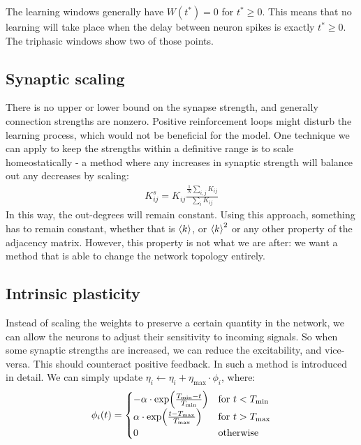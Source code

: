 The learning windows generally have $W(t^{\ast}) = 0$ for $t^{\ast} \geq 0$. This means that no learning will take place when the delay between neuron spikes is exactly $t^{\ast} \geq 0$. The triphasic windows show two of those points. 


\subsection{Synaptic scaling}
There is no upper or lower bound on the synapse strength, and generally connection strengths are nonzero. Positive reinforcement loops might disturb the learning process, which would not be beneficial for the model. One technique we can apply to keep the strengths within a definitive range is to scale homeostatically - a method where any increases in synaptic strength will balance out any decreases by scaling:
\begin{align}
K_{ij}^s = K_{ij} \frac{\frac{1}{N} \sum_{i,j} K_{ij}}{\sum_{i} K_{ij}}
\end{align}
In this way, the out-degrees will remain constant. Using this approach, something has to remain constant, whether that is ${\langle k\rangle}$, or ${\langle k\rangle}^2$ or any other property of the adjacency matrix. However, this property is not what we are after: we want a method that is able to change the network topology entirely.


\subsection{Intrinsic plasticity}
Instead of scaling the weights to preserve a certain quantity in the network, we can allow the neurons to adjust their sensitivity to incoming signals. So when some synaptic strengths are increased, we can reduce the excitability, and vice-versa. This should counteract positive feedback. In \cite{Song2017} such a method is introduced in detail. We can simply update $\eta_{i} \leftarrow \eta_{i} + \eta_{\max } \cdot \phi_{i}$, where: 
\begin{align}
\phi_{i} (t) =
\begin{cases}
-\alpha \cdot \exp \left(\frac{T_{\min }-t}{T_{\rm min }}\right) &\text {for } t<T_{ \rm min } \\ 
\alpha \cdot \exp \left(\frac{t-T_{\rm max }}{T_{\max }}\right) &\text {for } t >T_{\rm max } \\ 
0 &\text {otherwise }
\end{cases}
\end{align}

